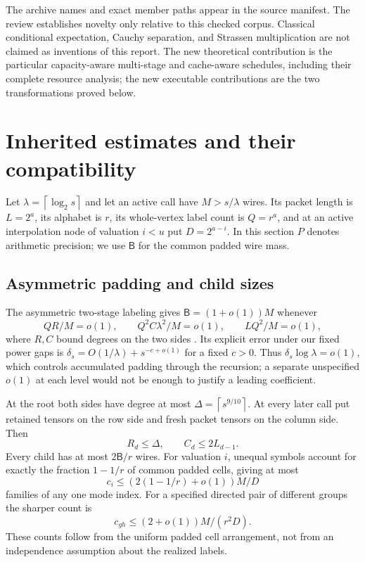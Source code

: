 \documentclass[11pt,letterpaper]{article}
\theoremstyle{remark}\newtheorem{remark}[theorem]{Remark}
\newcommand{\ceil}[1]{\left\lceil#1\right\rceil}
\begin{document}
The archive names and exact member paths appear in the source manifest.
The review establishes novelty only relative to this checked corpus.
Classical conditional expectation, Cauchy separation, and Strassen
multiplication are not claimed as inventions of this report. The new
theoretical contribution is the particular capacity-aware multi-stage
and cache-aware schedules, including their complete resource analysis;
the new executable contributions are the two transformations proved below.

\section{Inherited estimates and their compatibility}
\label{sec:inherited}

Let $\lambda=\ceil{\log_2s}$ and let an active call have $M>s/\lambda$
wires. Its packet length is $L=2^a$, its alphabet is $r$, its whole-vertex
label count is $Q=r^a$, and at an active interpolation node of valuation
$i<u$ put $D=2^{a-i}$. In this section $P$ denotes arithmetic precision;
we use $\mathsf B$ for the common padded wire mass.

\subsection{Asymmetric padding and child sizes}

The asymmetric two-stage labeling gives $\mathsf B=(1+o(1))M$ whenever
\begin{equation}\label{eq:packing-gates}
 QR/M=o(1),\qquad Q^2 C\lambda^2/M=o(1),\qquad LQ^2/M=o(1),
\end{equation}
where $R,C$ bound degrees on the two sides \cite{asymmetric}. Its explicit
error under our fixed power gaps is
$\delta_s=O(1/\lambda)+s^{-c+o(1)}$ for a fixed $c>0$. Thus
$\delta_s\log\lambda=o(1)$, which controls accumulated padding through
the recursion; a separate unspecified $o(1)$ at each level would not be
enough to justify a leading coefficient.

At the root both sides have degree at most $\Delta=\ceil{s^{9/10}}$.
At every later call put retained tensors on the row side and fresh packet
tensors on the column side. Then
\begin{equation}\label{eq:side-invariant}
 R_d\le\Delta,\qquad C_d\le2L_{d-1}.
\end{equation}
Every child has at most $2\mathsf B/r$ wires. For valuation $i$, unequal
symbols account for exactly the fraction $1-1/r$ of common padded cells,
giving at most
\begin{equation}\label{eq:families}
 c_i\le\left(2(1-1/r)+o(1)\right)M/D
\end{equation}
families of any one mode index. For a specified directed pair of different
groups the sharper count is
\begin{equation}\label{eq:pair-families}
 c_{gh}\le(2+o(1))M/(r^2D).
\end{equation}
These counts follow from the uniform padded cell arrangement, not from
an independence assumption about the realized labels.
\end{document}
